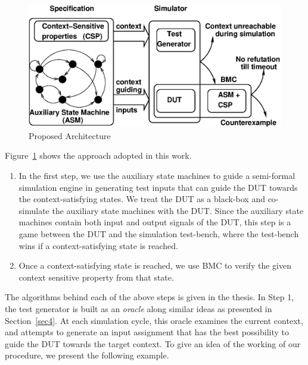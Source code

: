 \documentclass[a4paper, 11pt]{article}
\begin{document}
\begin{figure}[htb]
\centering
\includegraphics[scale=0.66]{diag4.eps}
\caption{Proposed Architecture} \label{fig3.1}
\end{figure}

Figure~\ref{fig3.1} shows the approach adopted in this work.
\begin{enumerate}

\item In the first step, we use the auxiliary state machines to guide
    a semi-formal simulation engine in generating test inputs 
	that can guide the DUT towards the context-satisfying
    states. We treat the DUT as a black-box and co-simulate the
    auxiliary state machines with the DUT. Since the auxiliary state
    machines contain both input and output signals of the DUT, this
    step is a game between the DUT and the simulation test-bench, where the
    test-bench wins if a context-satisfying state is reached.

\item Once a context-satisfying state is reached, we use BMC to verify
    the given context sensitive property from that state.

\end{enumerate}

\noindent
The algorithms behind each of the above steps is given in the thesis. 
In Step 1, the test generator is built as an {\em oracle} along similar ideas 
as presented in Section~\ref{sec4}. At each simulation cycle, this oracle 
examines the current context, and attempts to generate an input assignment 
that has the best possibility to guide the DUT towards the target context. 
To give an idea of the working of our procedure, we present the following 
example.
\end{document}
